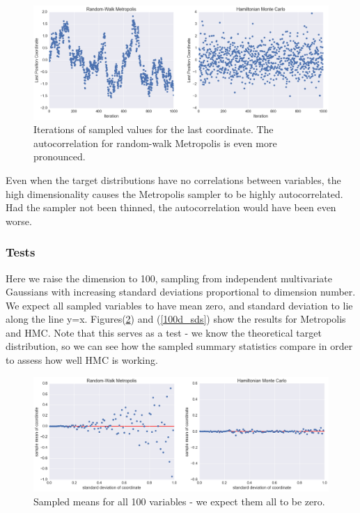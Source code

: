 \documentclass{article}
\numberwithin{equation}{section}
\begin{document}
\begin{figure}[H]
\centering
  \includegraphics[width=1\linewidth]{100d_iterations.png}
  \caption{Iterations of sampled values for the last coordinate. The autocorrelation for random-walk Metropolis is even more pronounced.}
\label{100d_iters}
\end{figure}

Even when the target distributions have no correlations between variables, the high dimensionality causes the Metropolis sampler to be highly autocorrelated. Had the sampler not been thinned, the autocorrelation would have been even worse.\\

\subsubsection{Tests}
Here we raise the dimension to 100, sampling from independent multivariate Gaussians with increasing standard deviations proportional to dimension number. We expect all sampled variables to have mean zero, and standard deviation to lie along the line y=x. Figures(\ref{100d_means}) and (\ref{100d_sds}) show the results for Metropolis and HMC. Note that this serves as a test - we know the theoretical target distribution, so we can see how the sampled summary statistics compare in order to assess how well HMC is working.

\begin{figure}[H]
\centering
  \includegraphics[width=1\linewidth]{100d_means.png}
  \caption{Sampled means for all 100 variables - we expect them all to be zero.}
\label{100d_means}
\end{figure}
\end{document}

